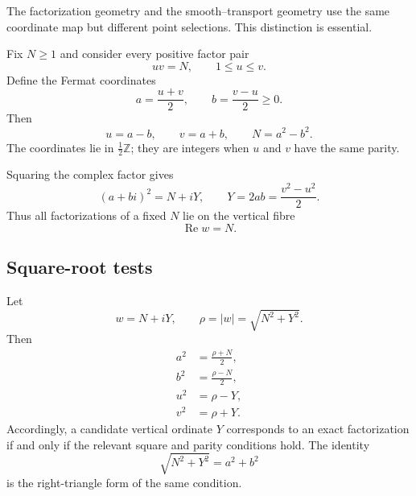 \documentclass[11pt]{article}
\theoremstyle{definition}
\theoremstyle{remark}
\newcommand{\1}{\mathbf{1}}
\newcommand{\Z}{\mathbb{Z}}
\newcommand{\Repart}{\operatorname{Re}}
\begin{document}
The factorization geometry and the smooth--transport geometry use the same coordinate map but different point selections.  This distinction is essential.

Fix $N\ge1$ and consider every positive factor pair
\begin{equation}
 uv=N,
 \qquad
 1\le u\le v.
 \label{eq:factor-pair}
\end{equation}
Define the Fermat coordinates
\begin{equation}
 a=\frac{u+v}{2},
 \qquad
 b=\frac{v-u}{2}\ge0.
 \label{eq:full-Fermat}
\end{equation}
Then
\begin{equation}
 u=a-b,
 \qquad
 v=a+b,
 \qquad
 N=a^2-b^2.
 \label{eq:full-recovery}
\end{equation}
The coordinates lie in $\frac12\Z$; they are integers when $u$ and $v$ have the same parity.

Squaring the complex factor gives
\begin{equation}
 (a+bi)^2=N+iY,
 \qquad
 \boxed{Y=2ab=\frac{v^2-u^2}{2}.}
 \label{eq:full-square}
\end{equation}
Thus all factorizations of a fixed $N$ lie on the vertical fibre
\begin{equation}
 \Repart w=N.
 \label{eq:vertical-fibre}
\end{equation}

\subsection{Square-root tests}

Let
\begin{equation}
 w=N+iY,
 \qquad
 \rho=|w|=\sqrt{N^2+Y^2}.
 \label{eq:rho-full}
\end{equation}
Then
\begin{align}
 a^2&=\frac{\rho+N}{2},
 \label{eq:a-square}\\
 b^2&=\frac{\rho-N}{2},
 \label{eq:b-square}\\
 u^2&=\rho-Y,
 \label{eq:u-square}\\
 v^2&=\rho+Y.
 \label{eq:v-square}
\end{align}
Accordingly, a candidate vertical ordinate $Y$ corresponds to an exact factorization if and only if the relevant square and parity conditions hold.  The identity
\begin{equation}
 \sqrt{N^2+Y^2}=a^2+b^2
 \label{eq:hypotenuse}
\end{equation}
is the right-triangle form of the same condition.
\end{document}
